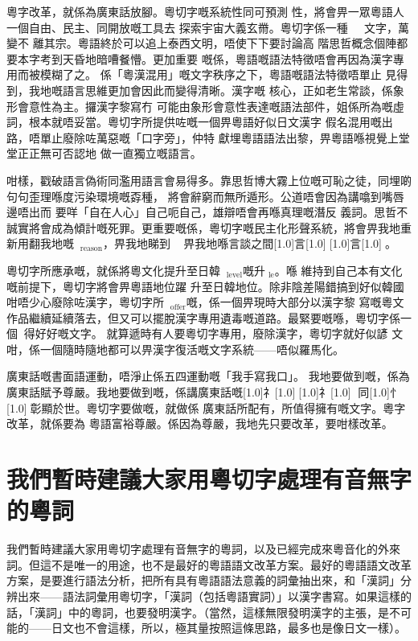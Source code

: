 粵字改革，就係為廣東話放腳。粵切字嘅系統性同可預測 性，將會畀一眾粵語人一個自由、民主、同開放嘅工具去 探索宇宙大義玄黹。粵切字係一種 文字，萬變不 離其宗。粵語終於可以追上泰西文明，唔使下下要討論高 階思哲概念個陣都要本字考到天昏地暗嘈餐懵。更加重要 嘅係，粵語嘅語法特徵唔會再因為漢字專用而被模糊了之。 係「粵漢混用」嘅文字秩序之下，粵語嘅語法特徵唔單止 見得到，我地嘅語言思維更加會因此而變得清晰。漢字嘅 核心，正如老生常談，係象形會意性為主。攞漢字黎寫冇 可能由象形會意性表達嘅語法部件，姐係所為嘅虛詞，根本就唔妥當。粵切字所提供咗嘅一個畀粵語好似日文漢字 假名混用嘅出路，唔單止廢除咗萬惡嘅「口字旁」，仲特 獻埋粵語語法出黎，畀粵語喺視覺上堂堂正正無可否認地 做一直獨立嘅語言。

咁樣，戳破語言偽術同濫用語言會易得多。靠思哲博大霧上位嘅可恥之徒，同埋啲句句歪理喺度污染環境嘅孬種， 將會辭窮而無所遁形。公道唔會因為講噏到嘴唇邊唔出而 要咩「自在人心」自己呃自己，雄辯唔會再喺真理嘅潛反 義詞。思哲不誠實將會成為傾計嘅死罪。更重要嘅係，粵切字嘅民主化形聲系統，將會畀我地重新用翻我地嘅$_{\text{reason}}$，畀我地睇到 ，畀我地喺言談之間\scalebox{0.5}[1.0]{言}\scalebox{0.5}[1.0]{}\scalebox{0.5}[1.0]{言}\scalebox{0.5}[1.0]{}。

粵切字所應承嘅，就係將粵文化提升至日韓$_{\text{level}}$嘅升$_{\text{le}}$。喺 維持到自己本有文化嘅前提下，粵切字將會畀粵語地位躍 升至日韓地位。除非陰差陽錯搞到好似韓國咁唔少心廢除咗漢字，粵切字所$_{\text{offer}}$嘅，係一個畀現時大部分以漢字黎 寫嘅粵文作品繼續延續落去，但又可以擺脫漢字專用遺毒嘅道路。最緊要嘅喺，粵切字係一個得好好嘅文字。 就算遞時有人要粵切字專用，廢除漢字，粵切字就好似諺 文咁，係一個隨時隨地都可以畀漢字復活嘅文字系統——唔似羅馬化。

廣東話嘅書面語運動，唔淨止係五四運動嘅「我手寫我口」。 我地要做到嘅，係為廣東話賦予尊嚴。我地要做到嘅，係講廣東話嘅\scalebox{0.5}[1.0]{礻}\scalebox{0.5}[1.0]{}\scalebox{0.5}[1.0]{礻}\scalebox{0.5}[1.0]{} 同\scalebox{0.5}[1.0]{忄}\scalebox{0.5}[1.0]{}彰顯於世。粵切字要做嘅，就做係 廣東話所配有，所值得擁有嘅文字。粵字改革，就係要為 粵語富裕尊嚴。係因為尊嚴，我地先只要改革，要咁樣改革。




\section{我們暫時建議大家用粵切字處理有音無字的粵詞}

我們暫時建議大家用粵切字處理有音無字的粵詞，以及已經完成來粵音化的外來詞。但這不是唯一的用途，也不是最好的粵語語文改革方案。最好的粵語語文改革方案，是要進行語法分析，把所有具有粵語語法意義的詞彙抽出來，和「漢詞」分辨出來——語法詞彙用粵切字，「漢詞（包括粵語實詞）」以漢字書寫。如果這樣的話，「漢詞」中的粵詞，也要發明漢字。（當然，這樣無限發明漢字的主張，是不可能的——日文也不會這樣，所以，極其量按照這條思路，最多也是像日文一樣）。

